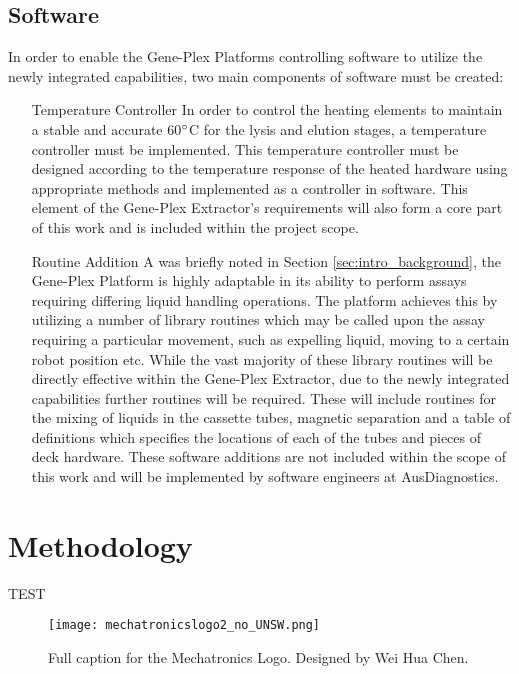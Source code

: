 \subsection{Software}
\label{sec:intro_software}
In order to enable the Gene-Plex Platforms controlling software to utilize the newly integrated capabilities, two main components of software must be created:
\begin{enumerate}
	\item[Temperature Controller] In order to control the heating elements to maintain a stable and accurate 60$\degree$C for the lysis and elution stages, a temperature controller must be implemented. This temperature controller must be designed according to the temperature response of the heated hardware using appropriate methods and implemented as a controller in software. This element of the Gene-Plex Extractor's requirements will also form a core part of this work and is included within the project scope.
	\item [Routine Addition] A was briefly noted in Section \ref{sec:intro_background}, the Gene-Plex Platform is highly adaptable in its ability to perform assays requiring differing liquid handling operations. The platform achieves this by utilizing a number of library routines which may be called upon the assay requiring a particular movement, such as expelling liquid, moving to a certain robot position etc. While the vast majority of these library routines will be directly effective within the Gene-Plex Extractor, due to the newly integrated capabilities further routines will be required. These will include routines for the mixing of liquids in the cassette tubes, magnetic separation and a table of definitions which specifies the locations of each of the tubes and pieces of deck hardware. These software additions are not included within the scope of this work and will be implemented by software engineers at AusDiagnostics.
\end{enumerate}


\section{Methodology}
\label{sec:intro_method}

TEST


\begin{figure}
\centering
\texttt{[image: mechatronicslogo2\_no\_UNSW.png]}
\caption[Short caption for list of figures.]{Full caption for the Mechatronics Logo. Designed by Wei Hua Chen.}
\label{fig:intro_logo}
\end{figure}


